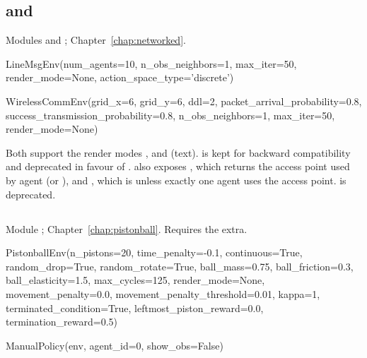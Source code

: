 \subsection{\texorpdfstring{ and }{LineMsgEnv and WirelessCommEnv}}

Modules  and ;
Chapter~\ref{chap:networked}.

\begin{pycode}
LineMsgEnv(num_agents=10, n_obs_neighbors=1, max_iter=50, render_mode=None,
           action_space_type='discrete')

WirelessCommEnv(grid_x=6, grid_y=6, ddl=2, packet_arrival_probability=0.8,
                success_transmission_probability=0.8, n_obs_neighbors=1,
                max_iter=50, render_mode=None)
\end{pycode}

Both support the render modes ,  and
 (text).  is kept for backward
compatibility and deprecated in favour of .
 also exposes , which returns the access point  used by
agent  (or ), and
, which
is  unless exactly one agent uses the access point.
 is deprecated.

\subsection{\texorpdfstring{}{PistonballEnv}}

Module ; Chapter~\ref{chap:pistonball}. Requires
the  extra.

\begin{pycode}
PistonballEnv(n_pistons=20, time_penalty=-0.1, continuous=True, random_drop=True,
              random_rotate=True, ball_mass=0.75, ball_friction=0.3,
              ball_elasticity=1.5, max_cycles=125, render_mode=None,
              movement_penalty=0.0, movement_penalty_threshold=0.01, kappa=1,
              terminated_condition=True, leftmost_piston_reward=0.0,
              termination_reward=0.5)

ManualPolicy(env, agent_id=0, show_obs=False)
\end{pycode}

